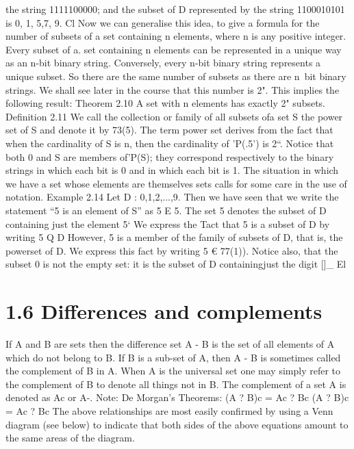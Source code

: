 {{{%
the string 1111100000; and the subset of D represented by the string 1100010101 is {0, 1, 5,7, 9}.
Cl
Now we can generalise this idea, to give a formula for the number of subsets of a set containing
n elements, where n is any positive integer. Every subset of a. set containing n elements can
be represented in a unique way as an n-bit binary string. Conversely, every n-bit binary string
represents a unique subset. So there are the same number of subsets as there are n~bit binary
strings. We shall see later in the course that this number is 2". This implies the following result:
Theorem 2.10 A set with n elements has exactly 2" subsets.
Deﬁnition 2.11 We call the collection or family of all subsets ofa set S the power set of S and
denote it by 73(5).
The term power set derives from the fact that when the cardinality of S is n, then the cardinality
of ’P(.5') is 2“. Notice that both 0 and S are members of'P(S); they correspond respectively to the
binary strings in which each bit is 0 and in which each bit is 1.
The situation in which we have a set whose elements are themselves sets calls for some care in the
use of notation.
Example 2.14 Let D : {0,1,2,...,9}. Then we have seen that we write the statement “5 is an
element of S” as
5 E 5.
The set {5} denotes the subset of D containing just the element 5‘ We express the Tact that {5}
is a subset of D by writing
{5} Q D
However, {5} is a member of the family of subsets of D, that is, the powerset of D. We express
this fact by writing
{5} € 77(1)).
Notice also, that the subset {0} is not the empty set: it is the subset of D containingjust the digit
[]_ El


\section{1.6 Differences and complements}
If A and B are sets then the difference set A - B is the set of all elements
of A which do not belong to B.
If B is a sub-set of A, then A - B is sometimes called the complement of
B in A. When A is the universal set one may simply refer to the
complement of B to denote all things not in B. The complement of a set A
is denoted as Ac or A-.
Note: De Morgan’s Theorems:
(A ? B)c = Ac ? Bc
(A ? B)c = Ac ? Bc
The above relationships are most easily confirmed by using a Venn
diagram (see below) to indicate that both sides of the above equations
amount to the same areas of the diagram.

}}}
